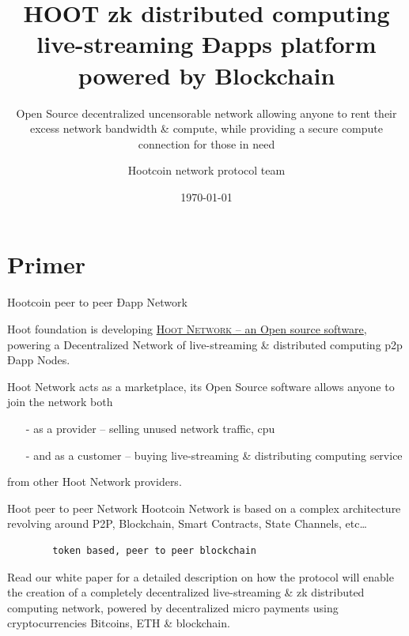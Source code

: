 \documentclass[10pt]{beamer}
\title{HOOT zk distributed computing live-streaming Ðapps platform powered by Blockchain}
\subtitle{Open Source decentralized uncensorable network allowing anyone to rent their excess network bandwidth \& compute, while providing a secure compute connection for those in need}
\date{\today}
\author{Hootcoin network protocol team}
\institute{Hootcoin Foundation}
\newcommand{\themename}{\textbf{\textsc{metropolis}}\xspace}
\begin{document}
\maketitle


\section{Primer}

\begin{frame}[fragile]{Hootcoin peer to peer Ðapp Network }

  Hoot foundation is developing \href{https://onhoot.com/tokensale}{\textsc{Hoot Network} – an Open source software}, powering a Decentralized Network of live-streaming \& distributed computing p2p Ðapp Nodes.
  

Hoot Network acts as a marketplace, its Open Source software allows anyone to join the network both 

\begin{itemize}
\item[-]as a provider – selling unused network traffic, cpu
\item[-]and as a customer – buying live-streaming \& distributing computing service
\end{itemize}
 from other Hoot Network providers. 
\end{frame}
\begin{frame}[fragile]{Hoot peer to peer Network }
  Hootcoin Network is based on a complex architecture revolving around P2P, Blockchain, Smart Contracts, State Channels, etc\ldots
    \begin{verbatim}  
        token based, peer to peer blockchain 
  \end{verbatim}
  
   Read our white paper for a detailed description on how the protocol will enable the creation of a completely decentralized live-streaming \& zk distributed computing network, powered by decentralized micro payments using cryptocurrencies Bitcoins, ETH \& blockchain. 


\end{frame}
\end{document}
